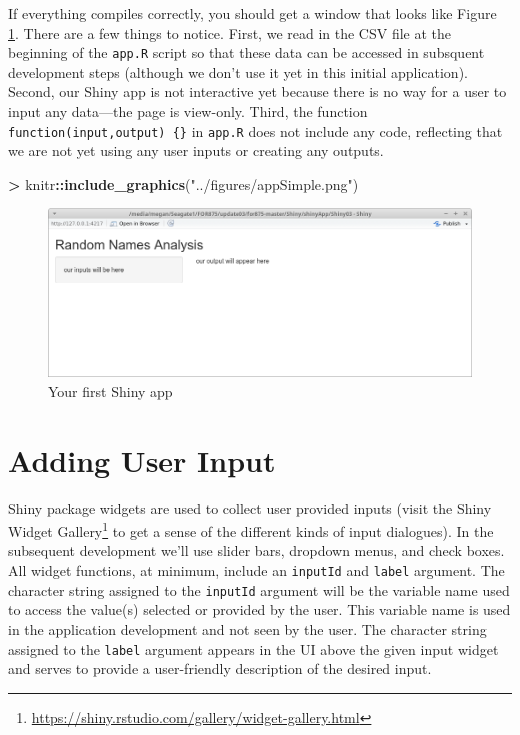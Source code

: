 \documentclass[]{krantz}
\makeatletter
\newenvironment{Shaded}{\begin{snugshade}}{\end{snugshade}}
\newcommand{\KeywordTok}[1]{\textcolor[rgb]{0.27,0.27,0.27}{\textbf{#1}}}
\newcommand{\NormalTok}[1]{#1}
\newcommand{\OperatorTok}[1]{\textcolor[rgb]{0.43,0.43,0.43}{\textbf{#1}}}
\newcommand{\StringTok}[1]{\textcolor[rgb]{0.5,0.5,0.5}{#1}}
\renewcommand{\href}[2]{#2\footnote{\url{#1}}}
\newenvironment{kframe}{%
\medskip{}
\setlength{\fboxsep}{.8em}
 \def\at@end@of@kframe{}%
 \ifinner\ifhmode%
  \def\at@end@of@kframe{\end{minipage}}%
  \begin{minipage}{\columnwidth}%
 \fi\fi%
 \def\FrameCommand##1{\hskip\@totalleftmargin \hskip-\fboxsep
 \colorbox{shadecolor}{##1}\hskip-\fboxsep
     \hskip-\linewidth \hskip-\@totalleftmargin \hskip\columnwidth}%
 \MakeFramed {\advance\hsize-\width
   \@totalleftmargin\z@ \linewidth\hsize
   \@setminipage}}%
 {\par\unskip\endMakeFramed%
 \at@end@of@kframe}
\renewenvironment{Shaded}{\begin{kframe}}{\end{kframe}}
\makeatother
\begin{document}
If everything compiles correctly, you should get a window that looks like Figure \ref{fig:fig2}. There are a few things to notice. First, we read in the CSV file at the beginning of the \texttt{app.R} script so that these data can be accessed in subsquent development steps (although we don't use it yet in this initial application). Second, our Shiny app is not interactive yet because there is no way for a user to input any data---the page is view-only. Third, the function \texttt{function(input,output)\ \{\}} in \texttt{app.R} does not include any code, reflecting that we are not yet using any user inputs or creating any outputs.

\begin{Shaded}
\begin{Highlighting}[]
\OperatorTok{>}\StringTok{ }\NormalTok{knitr}\OperatorTok{::}\KeywordTok{include_graphics}\NormalTok{(}\StringTok{"../figures/appSimple.png"}\NormalTok{)}
\end{Highlighting}
\end{Shaded}

\begin{figure}
\includegraphics[width=13.36in]{../figures/appSimple} \caption{Your first Shiny app}\label{fig:fig2}
\end{figure}

\hypertarget{adding-user-input}{%
\section{Adding User Input}\label{adding-user-input}}

Shiny package widgets are used to collect user provided inputs (visit the \href{https://shiny.rstudio.com/gallery/widget-gallery.html}{Shiny Widget Gallery} to get a sense of the different kinds of input dialogues). In the subsequent development we'll use slider bars, dropdown menus, and check boxes. All widget functions, at minimum, include an \texttt{inputId} and \texttt{label} argument. The character string assigned to the \texttt{inputId} argument will be the variable name used to access the value(s) selected or provided by the user. This variable name is used in the application development and not seen by the user. The character string assigned to the \texttt{label} argument appears in the UI above the given input widget and serves to provide a user-friendly description of the desired input.
\end{document}
